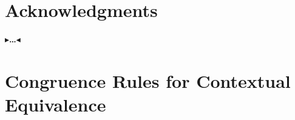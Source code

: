 \documentclass[twoside,11pt,openright]{report}
\theoremstyle{definition}
\newcommand{\todo}[1]{{\color[rgb]{.5,0,0}\textbf{$\blacktriangleright$#1$\blacktriangleleft$}}}
\begin{document}

\chapter*{Acknowledgments}

\todo{\dots}


\cleardoublepage
{}
 



\cleardoublepage
\appendix
\chapter{Congruence Rules for Contextual Equivalence}\label{appendix:Cng}
\end{document}
